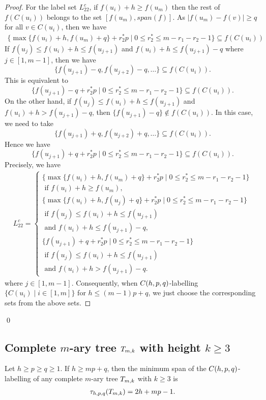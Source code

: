 \begin{proof}
For the label set $L_{22}^c$, if $f(u_i)+h \ge f(u_m)$ then the rest of $f(C(u_i))$ belongs to the set $[f(u_m), span(f)]$. As $|f(u_m) -f(v)| \ge q$ for all $v \in C(u_i)$, then we have 
\begin{align*}
\{\max\{f(u_i)+h, f(u_m)+q\} +r_2^*p \mid 0 \le r_2^* \le m-r_1-r_2-1\} \subseteq f(C(u_i))
\end{align*}
If $f(u_j) \le f(u_i)+h \le f(u_{j+1})$ and $f(u_i)+h \le f(u_{j+1})-q$ where $j \in [1,m-1]$, then we have 
\[
\{f(u_{j+1})-q, f(u_{j+2})-q, \dots\} \subseteq f(C(u_i)).
\]
This is equivalent to 
\[
\{f(u_{j+1})-q+r_2^*p \mid 0 \le r_2^* \le m-r_1-r_2-1\} \subseteq f(C(u_i)).
\]
On the other hand, if $f(u_j) \le f(u_i)+h \le f(u_{j+1})$ and \\$f(u_i)+h > f(u_{j+1})-q$, then $\{f(u_{j+1})-q\} \not\in f(C(u_i))$. In this case, we need to take 
\[
\{f(u_{j+1})+q, f(u_{j+2})+q, \dots\} \subseteq f(C(u_i)). 
\]
Hence we have 
\[
\{f(u_{j+1})+q+r_2^*p \mid 0 \le r_2^* \le m-r_1-r_2-1\} \subseteq f(C(u_i)).
\]
Precisely, we have 
\begin{align*}
L_{22}^c =
\begin{cases}
\{\max\{f(u_i)+h, f(u_m)+q\}+r_2^*p \mid 0 \le r_2^* \le m-r_1-r_2-1\} \\ \text{ if } f(u_i)+h \ge f(u_m), \\
\{\max\{f(u_i)+h, f(u_j)+q\} + r_2^*p \mid 0 \le r_2^* \le m-r_1-r_2-1\} \\ \text{ if } f(u_j) \le f(u_i)+h \le f(u_{j+1}) \\ \text{ and }f(u_i)+h \le f(u_{j+1})-q,\\
\{f(u_{j+1})+q+r_2^*p \mid 0 \le r_2^* \le m-r_1-r_2-1\} \\ \text{ if } f(u_j) \le f(u_i)+h \le f(u_{j+1}) \\ \text{ and }f(u_i)+h > f(u_{j+1})-q.
\end{cases}
\end{align*}
where $j \in [1,m-1]$. 
Consequently, when $C(h,p,q)$-labelling $\{C(u_i) \mid i \in [1,m]\}$ for $h \le (m-1)p+q$, we just choose the corresponding sets from the above sets.  
\end{proof}
\qed


\subsection{Complete $m$-ary tree $T_{m,k}$ with height $k \ge 3$}

\begin{theorem}
\label{chpq3}
Let $h \ge p \ge q \ge 1$. If $h \ge mp+q$, then the minimum span of the $C(h,p,q)$-labelling of any complete $m$-ary tree $T_{m,k}$ with $k \ge 3$ is  
\begin{align*}
\tau_{h,p,q}(T_{m,k}) = 2h+mp-1. 
\end{align*}

\end{theorem}

